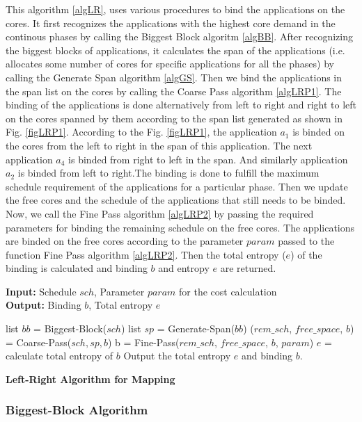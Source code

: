 \documentclass[10pt, conference]{IEEEtran}
\begin{document}
This algorithm \ref{algLR}, uses various procedures to bind the applications on the cores. It first recognizes the applications with the highest core demand in the continous phases by calling the Biggest Block algoritm \ref{algBB}. After recognizing the biggest blocks of applications, it calculates the span of the applications (i.e. allocates some number of cores for specific applications for all the phases) by calling the Generate Span algorithm \ref{algGS}. Then we bind the applications in the span list on the cores by calling the Coarse Pass algorithm \ref{algLRP1}. The binding of the applications is done alternatively from left to right and right to left on the cores spanned by them according to the span list generated as shown in Fig. \ref{figLRP1}. According to the Fig. \ref{figLRP1}, the application $a_1$ is binded on the cores from the left to right in the span of this application. The next application $a_4$ is binded from right to left in the span. And similarly application $a_2$ is binded from left to right.The binding is done to fulfill the maximum schedule requirement of the applications for a particular phase. Then we update the free cores and the schedule of the applications that still needs to be binded. Now, we call the Fine Pass algorithm \ref{algLRP2} by passing the required parameters for binding the remaining schedule on the free cores. The applications are binded on the free cores according to the parameter $param$ passed to the function Fine Pass algorithm \ref{algLRP2}. Then the total entropy ($e$) of the binding is calculated and binding $b$ and entropy $e$ are returned.

\begin{algorithm}[tb]
\footnotesize
\textbf{Input:} Schedule $sch$, Parameter $param$ for the cost calculation \ \\
\textbf{Output:} Binding $b$, Total entropy $e$
\begin{algorithmic}[1]
\STATE list $bb$ = Biggest-Block($sch$)
\STATE list $sp$ = Generate-Span($bb$)
\STATE  ($rem\_sch$, $free\_space$, $b$) = Coarse-Pass($sch, sp, b$)
\STATE b = Fine-Pass($rem\_sch$, $free\_space$, $b$, $param$)
\STATE  $e$ = calculate total entropy of $b$
\STATE Output the total entropy $e$ and binding $b$.
\end{algorithmic}
\caption{\textbf{Left-Right Algorithm for Mapping}}
\vspace{-0.1cm}
\label{algLR}
\end{algorithm}

\subsubsection{Biggest-Block Algorithm}
\end{document}
